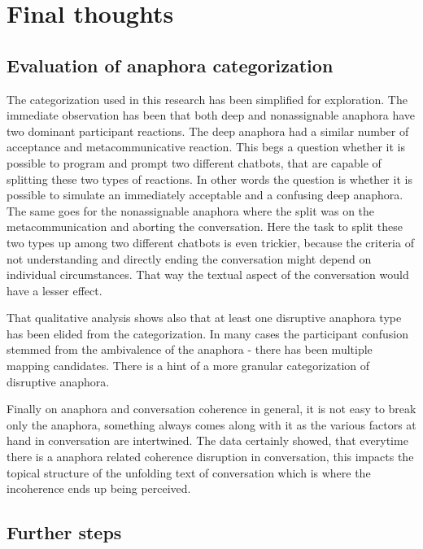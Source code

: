\documentclass[12pt]{report}
\begin{document}
{

\chapter{Final thoughts}

\section{Evaluation of anaphora categorization}

    The categorization used in this research has been simplified for exploration.
    The immediate observation has been that both deep and nonassignable anaphora
    have two dominant participant reactions.
    The deep anaphora had a similar number of acceptance and metacommunicative reaction.
    This begs a question whether it is possible to program and prompt two different chatbots,
    that are capable of splitting these two types of reactions.
    In other words the question is whether it is possible to simulate an immediately acceptable
    and a confusing deep anaphora.
    The same goes for the nonassignable anaphora
    where the split was on the metacommunication and aborting the conversation.
    Here the task to split these two types up among two different chatbots is even trickier,
    because the criteria of not understanding and directly ending the conversation might depend on
    individual circumstances.
    That way the textual aspect of the conversation would have a lesser effect.

    That qualitative analysis shows also that
    at least one disruptive anaphora type has been elided from the categorization.
    In many cases the participant confusion stemmed from the ambivalence of the anaphora -
    there has been multiple mapping candidates.
    There is a hint of a more granular categorization of disruptive anaphora.

    Finally on anaphora and conversation coherence in general,
    it is not easy to break only the anaphora,
    something always comes along with it as the various factors at hand in conversation are intertwined.
    The data certainly showed, that everytime there is a anaphora related coherence disruption in conversation,
    this impacts the topical structure of the unfolding text of conversation
    which is where the incoherence ends up being perceived.

\section{Further steps}


}
\end{document}

